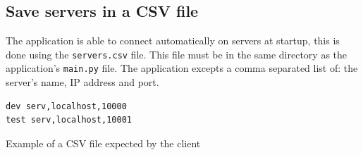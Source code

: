 \documentclass{article}
\begin{document}
\newpage
\subsection{Save servers in a CSV file}
The application is able to connect automatically on servers at startup, this is
done using the \verb|servers.csv| file. This file must be in the same directory
as the application's \verb|main.py| file. The application excepts a comma
separated list of: the server's name, IP address and port.
\begin{listing}[H]
    \begin{verbatim}
dev serv,localhost,10000
test serv,localhost,10001
    \end{verbatim}
    \caption{Example of a CSV file expected by the client}
    \label{venv:csv}
\end{listing}
\end{document}
